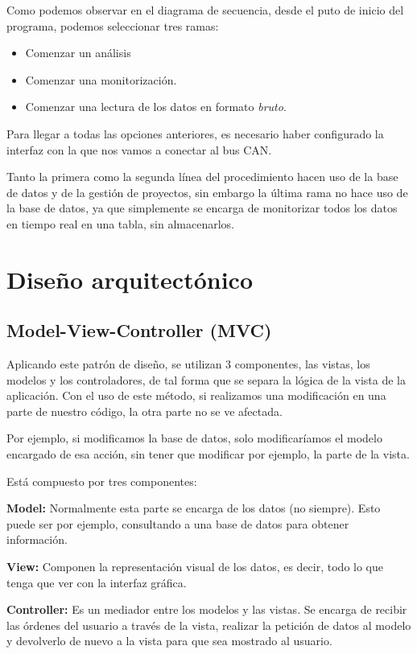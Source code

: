
Como podemos observar en el diagrama de secuencia, desde el puto de inicio del programa, podemos seleccionar tres ramas:
\begin{itemize}
\item
Comenzar un análisis
\item
Comenzar una monitorización.
\item
Comenzar una lectura de los datos en formato \emph{bruto}.
\end{itemize}

Para llegar a todas las opciones anteriores, es necesario haber configurado la interfaz con la que nos vamos a conectar al bus CAN.

Tanto la primera como la segunda línea del procedimiento hacen uso de la base de datos y de la gestión de proyectos, sin embargo la última rama no hace uso de la base de datos, ya que simplemente se encarga de monitorizar todos los datos en tiempo real en una tabla, sin almacenarlos.

\section{Diseño arquitectónico}

\subsection{Model-View-Controller (MVC)}

Aplicando este patrón de diseño, se utilizan 3 componentes, las vistas, los modelos y los controladores, de tal forma que se separa la lógica de la vista de la aplicación. Con el uso de este método, si realizamos una modificación en una parte de nuestro código, la otra parte no se ve afectada.

Por ejemplo, si modificamos la base de datos, solo modificaríamos el modelo encargado de esa acción, sin tener que modificar por ejemplo, la parte de la vista.

Está compuesto por tres componentes:

\textbf{Model:} Normalmente esta parte se encarga de los datos (no siempre). Esto puede ser por ejemplo, consultando a una base de datos para obtener información.

\textbf{View:} Componen la representación visual de los datos, es decir, todo lo que tenga que ver con la interfaz gráfica.

\textbf{Controller:} Es un mediador entre los modelos y las vistas. Se encarga de recibir las órdenes del usuario a través de la vista, realizar la petición de datos al modelo y devolverlo de nuevo a la vista para que sea mostrado al usuario.

